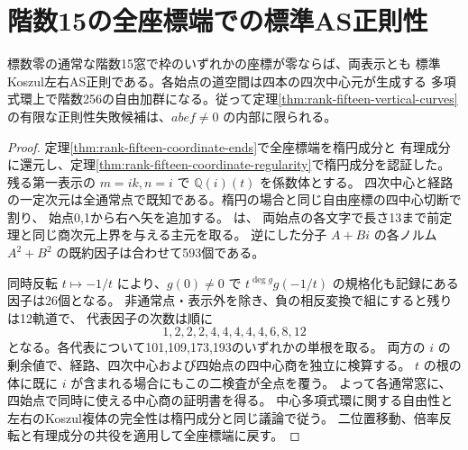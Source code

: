 \section{階数15の全座標端での標準AS正則性}
\label{sec:rank-fifteen-all-coordinate-ends}
\begin{theorem}\label{thm:rank-fifteen-all-coordinate-ends}
標数零の通常な階数15窓で枠のいずれかの座標が零ならば、両表示とも
標準Koszul左右AS正則である。各始点の道空間は四本の四次中心元が生成する
多項式環上で階数256の自由加群になる。従って定理\ref{thm:rank-fifteen-vertical-curves}
の有限な正則性失敗候補は、$abef\ne0$ の内部に限られる。
\end{theorem}
\begin{proof}
定理\ref{thm:rank-fifteen-coordinate-ends}で全座標端を楕円成分と
有理成分に還元し、定理\ref{thm:rank-fifteen-coordinate-regularity}で楕円成分を認証した。
残る第一表示の $m=ik,n=i$ で $\mathbb Q(i)(t)$ を係数体とする。
四次中心と経路の一定次元は全通常点で既知である。楕円の場合と同じ自由座標の四中心切断で割り、
始点0,1から右へ矢を追加する。
 は、
両始点の各文字で長さ13まで前定理と同じ商次元上界を与える主元を取る。
逆にした分子 $A+Bi$ の各ノルム $A^2+B^2$ の既約因子は合わせて593個である。

同時反転 $t\mapsto-1/t$ により、$g(0)\ne0$ で
$t^{\deg g}g(-1/t)$ の規格化も記録にある因子は26個となる。
非通常点・表示外を除き、負の相反変換で組にすると残りは12軌道で、
代表因子の次数は順に
\[
 1,2,2,2,4,4,4,4,4,6,8,12
\]
となる。各代表について101,109,173,193のいずれかの単根を取る。
両方の $i$ の剰余値で、経路、四次中心および四始点の四中心商を独立に検算する。
$t$ の根の体に既に $i$ が含まれる場合にもこの二検査が全点を覆う。
よって各通常窓に、四始点で同時に使える中心商の証明書を得る。
中心多項式環に関する自由性と左右のKoszul複体の完全性は楕円成分と同じ議論で従う。
二位置移動、倍率反転と有理成分の共役を適用して全座標端に戻す。
\end{proof}
